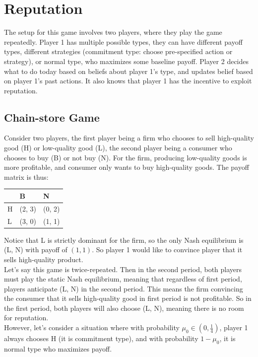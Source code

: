 \section{Reputation}
The setup for this game involves two players, where they play the game repeatedly. Player 1 has multiple possible types, they can have different payoff types, different strategies (commitment type: choose pre-specified action or strategy), or normal type, who maximizes some baseline payoff. Player 2 decides what to do today based on beliefs about player 1's type, and updates belief based on player 1's past actions. It also knows that player 1 has the incentive to exploit reputation.

\subsection{Chain-store Game}
Consider two players, the first player being a firm who chooses to sell high-quality good (H) or low-quality good (L), the second player being a consumer who chooses to buy (B) or not buy (N). For the firm, producing low-quality goods is more profitable, and consumer only wants to buy high-quality goods. The payoff matrix is thus:
\begin{center}
    \begin{tabular}{|l|l|l|}
    \hline
    & B & N \\ \hline
    H & (2, 3) & (0, 2) \\ \hline
    L & (3, 0) & (1, 1) \\ \hline
    \end{tabular}
\end{center}
Notice that L is strictly dominant for the firm, so the only Nash equilibrium is (L, N) with payoff of $(1, 1)$. So player 1 would like to convince player that it sells high-quality product. \\
Let's say this game is twice-repeated. Then in the second period, both players must play the static Nash equilibrium, meaning that regardless of first period, players anticipate (L, N) in the second period. This means the firm convincing the consumer that it sells high-quality good in first period is not profitable. So in the first period, both players will also choose (L, N), meaning there is no room for reputation. \\
However, let's consider a situation where with probability $\mu_0 \in (0, \frac{1}{4})$, player 1 always chooses H (it is commitment type), and with probability $1 - \mu_0$, it is normal type who maximizes payoff. \\
